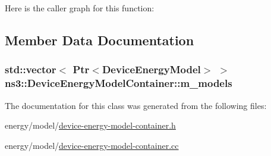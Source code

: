 Here is the caller graph for this function\+:




\subsection{Member Data Documentation}
\subsubsection[{\texorpdfstring{m\+\_\+models}{m_models}}]{\setlength{\rightskip}{0pt plus 5cm}std\+::vector$<$ {\bf Ptr}$<${\bf Device\+Energy\+Model}$>$ $>$ ns3\+::\+Device\+Energy\+Model\+Container\+::m\+\_\+models\hspace{0.3cm}{\ttfamily [private]}}\hypertarget{classns3_1_1DeviceEnergyModelContainer_a4dbf51f6369edf048c1072096c9c886f}{}\label{classns3_1_1DeviceEnergyModelContainer_a4dbf51f6369edf048c1072096c9c886f}


The documentation for this class was generated from the following files\+:\begin{DoxyCompactItemize}
\item 
energy/model/\hyperlink{device-energy-model-container_8h}{device-\/energy-\/model-\/container.\+h}\item 
energy/model/\hyperlink{device-energy-model-container_8cc}{device-\/energy-\/model-\/container.\+cc}\end{DoxyCompactItemize}
